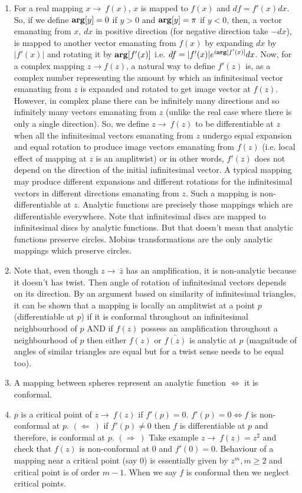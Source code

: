 \documentclass[12pt]{article}
\newcommand{\rto}{\rightarrow\ }
\newcommand{\Rto}{\Rightarrow\ }
\newcommand{\Lto}{\Leftarrow\ }
\def\mf{\ensuremath\mathbf}
\begin{document}
\begin{enumerate}
    \item For a real mapping $x\rto f(x)$, $x$ is mapped to $f(x)$ and $df = f'(x)dx$. So, if we define $\mf{arg}[y] = 0$ if $y>0$ and $\mf{arg}[y] = \pi$ if $y<0$, then, a vector emanating from $x$, $dx$ in positive direction (for negative direction take $-dx$), is mapped to another vector emanating from $f(x)$ by expanding $dx$ by $|f'(x)|$ and rotating it by $\mf{arg}[f'(x)]$ i.e. $df = |f'(x)|e^{i\mf{arg}[f'(x)]}dx$. Now, for a complex mapping $z\rightarrow f(z)$, a natural way to define $f'(z)$ is, as a complex number representing the amount by which an infinitesimal vector emanating from $z$ is expanded and rotated to get image vector at $f(z)$. However, in complex plane there can be infinitely many directions and so infinitely many vectors emanating from $z$ (unlike the real case where there is only a single direction). So, we define $z\rto f(z)$ to be differentiable at $z$ when all the infinitesimal vectors emanating from $z$ undergo equal expansion and equal rotation to produce image vectors emanating from $f(z)$ (i.e. local effect of mapping at $z$ is an amplitwist) or in other words, $f'(z)$ does not depend on the direction of the initial infinitesimal vector. A typical mapping may produce different expansions and different rotations for the infinitesimal vectors in different directions emanating from $z$. Such a mapping is non-differentiable at $z$. Analytic functions are precisely those mappings which are differentiable everywhere. Note that infinitesimal discs are mapped to infinitesimal discs by analytic functions. But that doesn't mean that analytic functions preserve circles. Mobius transformations are the only analytic mappings which preserve circles.
    \item Note that, even though $z\rto \bar{z}$ has an amplification, it is non-analytic because it doesn't has twist. Then angle of rotation of infinitesimal vectors depends on its direction. By an argument based on similarity of infinitesimal triangles, it can be shown that a mapping is locally an amplitwist at a point $p$ (differentiable at $p$) if it is conformal throughout an infinitesimal neighbourhood of $p$ AND if $f(z)$ possess an amplification throughout a neighbourhood of $p$ then either $f(z)$ or $\bar{f(z)}$ is analytic at $p$ (magnitude of angles of similar triangles are equal but for a twist sense needs to be equal too).
    \item A mapping between spheres represent an analytic function $\iff$ it is conformal.
    \item $p$ is a critical point of $z\rto f(z)$ if $f'(p) = 0$. $f'(p) = 0 \iff f$ is non-conformal at $p$. $(\Lto)$ if $f'(p) \neq 0$ then $f$ is differentiable at $p$ and therefore, is conformal at $p$. $(\Rto)$ Take example $z\rto f(z)=z^2$ and check that $f(z)$ is non-conformal at $0$ and $f'(0)=0$. Behaviour of a mapping near a critical point (say $0$) is essentially given by $z^m, m \geq 2$ and critical point is of order $m-1$. When we say $f$ is conformal then we neglect critical points.

\end{enumerate}
\end{document}
